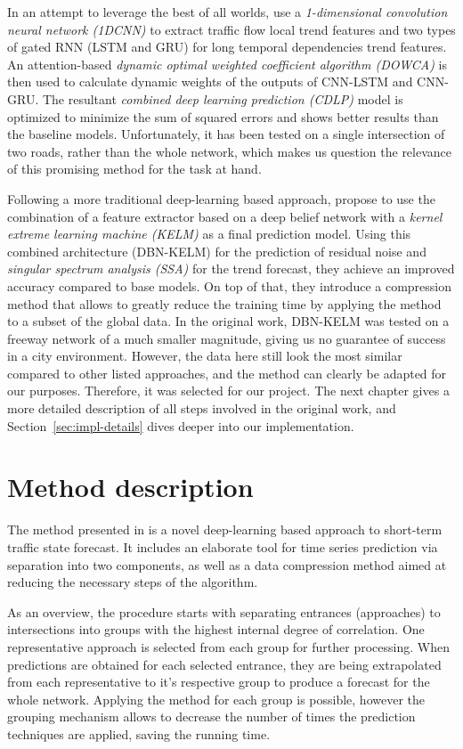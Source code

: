 In an attempt to leverage the best of all worlds, \citet{Hassannayebi.2021} use
a \textit{1-dimensional convolution neural network (1DCNN)} to extract traffic
flow local trend features and two types of gated RNN (LSTM and GRU) for long
temporal dependencies trend features. An attention-based \textit{dynamic optimal
weighted coefficient algorithm (DOWCA)} is then used to calculate dynamic
weights of the outputs of CNN-LSTM and CNN-GRU. The resultant \textit{combined
deep learning prediction (CDLP)} model is optimized to minimize the sum of
squared errors and shows better results than the baseline models. Unfortunately,
it has been tested on a single intersection of two roads, rather than the whole
network, which makes us question the relevance of this promising method for the 
task at hand.

Following a more traditional deep-learning based approach, \citet{Han.2020}
propose to use the combination of a feature extractor based on a deep belief 
network with a \textit{kernel extreme learning machine (KELM)} as a final
prediction model. Using this combined architecture (DBN-KELM) for the prediction
of residual noise and \textit{singular spectrum analysis (SSA)}
\cite{Leles.2017} for the trend forecast, they achieve an improved accuracy
compared to base models. On top of that, they introduce a compression method
that allows to greatly reduce the training time by applying the method to a
subset of the global data. In the original work, DBN-KELM was tested on a
freeway network of a much smaller magnitude, giving us no guarantee of success
in a city environment. However, the data here still look the most similar
compared to other listed approaches, and the method can clearly be adapted for
our purposes. Therefore, it was selected for our project. The next chapter gives
a more detailed description of all steps involved in the original work, and
Section~\ref{sec:impl-details} dives deeper into our implementation.


\chapter{Method description}

The method presented in \citet{Han.2020} is a novel deep-learning based approach
to short-term traffic state forecast. It includes an elaborate tool for time
series prediction via separation into two components, as well as a data
compression method aimed at reducing the necessary steps of the algorithm.

As an overview, the procedure starts with separating entrances (approaches) to 
intersections into groups with the highest internal degree of correlation. One
representative approach is selected from each group for further processing. 
When predictions are obtained for each selected entrance, they are being
extrapolated from each representative to it's respective group to produce a
forecast for the whole network. Applying the method for each group is possible,
however the grouping mechanism allows to decrease the number of times the
prediction techniques are applied, saving the running time.

